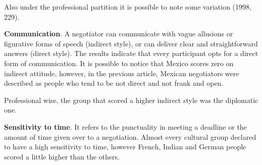 \documentclass[../main.tex]{subfiles}
\begin{document}
Also under the professional partition it is possible to note some variation (1998, 229).

\vspace{0.3cm}
\begin{minipage}{\linewidth}
    \label{personalStylePerProfession}
\end{minipage}
\vspace{0.3cm}

\textbf{Communication}. A negotiator can communicate with vague allusions or figurative forms of speech (indirect style), or can deliver clear and straightforward answers (direct style). The results indicate that every participant opts for a direct form of communication. It is possible to notice that Mexico scores zero on indirect attitude, however, in the previous article, Mexican negotiators were described as people who tend to be not direct and not frank and open.

\vspace{0.3cm}
\begin{minipage}{\linewidth}
    \label{communicationStylePerCountry}
\end{minipage}
\vspace{0.3cm}

Professional wise, the group that scored a higher indirect style was the diplomatic one.

\textbf{Sensitivity to time}. It refers to the punctuality in meeting a deadline or the amount of time given over to a negotiation. Almost every cultural group declared to have a high sensitivity to time, however French, Indian and German people scored a little higher than the others.

\vspace{0.3cm}
\begin{minipage}{\linewidth}
    \label{sensitivityTimePerCountry}
\end{minipage}
\vspace{0.3cm}
\end{document}
